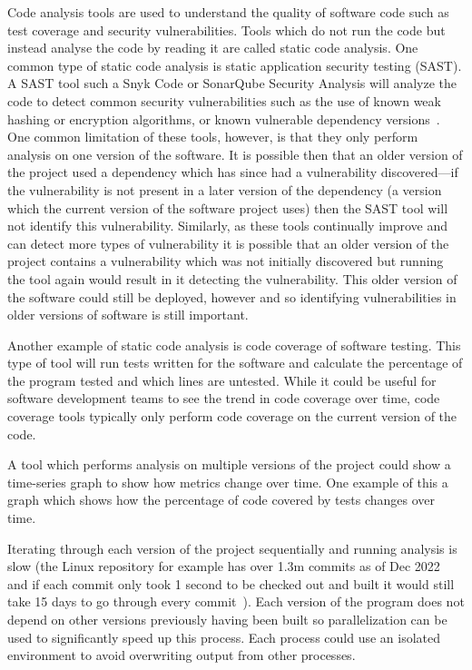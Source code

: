 Code analysis tools are used to understand the quality of software code such as test coverage and security vulnerabilities.
Tools which do not run the code but instead analyse the code by reading it are called static code analysis.
One common type of static code analysis is static application security testing (SAST).
A SAST tool such a Snyk Code or SonarQube Security Analysis will analyze the code to detect common security vulnerabilities such as the use of known weak hashing or encryption algorithms, or known vulnerable dependency versions~\cite{scat}.
One common limitation of these tools, however, is that they only perform analysis on one version of the software.
It is possible then that an older version of the project used a dependency which has since had a vulnerability discovered---if the vulnerability is not present in a later version of the dependency (a version which the current version of the software project uses) then the SAST tool will not identify this vulnerability.
Similarly, as these tools continually improve and can detect more types of vulnerability it is possible that an older version of the project contains a vulnerability which was not initially discovered but running the tool again would result in it detecting the vulnerability.
This older version of the software could still be deployed, however and so identifying vulnerabilities in older versions of software is still important.

Another example of static code analysis is code coverage of software testing.
This type of tool will run tests written for the software and calculate the percentage of the program tested and which lines are untested.
While it could be useful for software development teams to see the trend in code coverage over time, code coverage tools typically only perform code coverage on the current version of the code.

A tool which performs analysis on multiple versions of the project could show a time-series graph to show how metrics change over time.
One example of this a graph which shows how the percentage of code covered by tests changes over time.

Iterating through each version of the project sequentially and running analysis is slow (the Linux repository for example has over 1.3m commits as of Dec 2022 and if each commit only took 1 second to be checked out and built it would still take 15 days to go through every commit~\cite{linux_git}).
Each version of the program does not depend on other versions previously having been built so parallelization can be used to significantly speed up this process.
Each process could use an isolated environment to avoid overwriting output from other processes.

